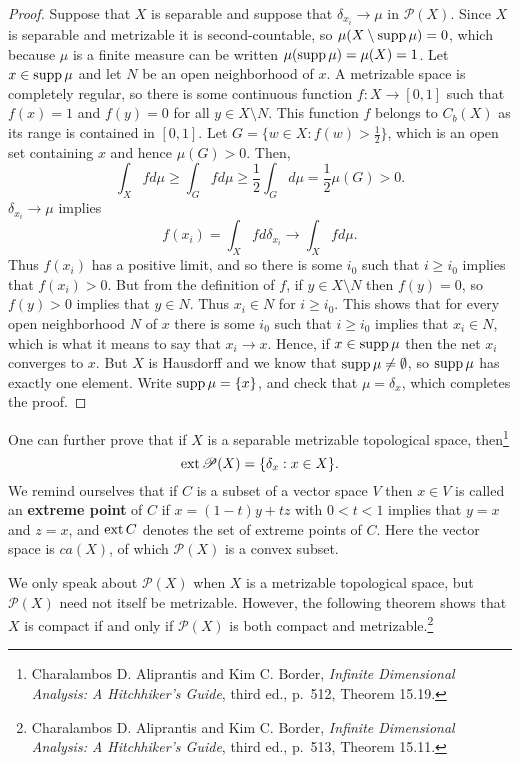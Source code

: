 \documentclass{article}
\newcommand{\supp}{\ensuremath\mathrm{supp}\,}
\newcommand{\ext}{\ensuremath\mathrm{ext}\,}
\theoremstyle{definition}
\theoremstyle{definition}
\begin{document}
\begin{proof}
Suppose that $X$ is separable and suppose that $\delta_{x_i} \to \mu$ in $\mathscr{P}(X)$. 
Since $X$ is separable and metrizable  it is second-countable, so $\mu(X \setminus \supp \mu)=0$, which because $\mu$ is a finite measure
can be written $\mu(\supp \mu)=\mu(X)=1$. Let $x \in \supp \mu$ and let $N$ be an open neighborhood of $x$. 
 A metrizable space is completely regular,  so there is some continuous function $f:X \to [0,1]$ such that
$f(x)=1$ and $f(y)=0$ for all $y \in X \setminus N$. This function $f$ belongs to $C_b(X)$ as its range is contained in $[0,1]$.
Let $G=\{w \in X: f(w)>\frac{1}{2}\}$, which is an open set containing $x$ and hence
$\mu(G)>0$. Then,
\[
\int_X f d\mu \geq \int_G f d\mu \geq \frac{1}{2} \int_G d\mu= \frac{1}{2}\mu(G)>0.
\]
 $\delta_{x_i} \to \mu$ implies
\[
f(x_i) = \int_X f d\delta_{x_i} \to \int_X f d\mu.
\]
Thus $f(x_i)$ has a positive limit, and so there is some $i_0$ such that $i \geq i_0$ implies that
$f(x_i)>0$. 
But from the definition of $f$, if $y \in X \setminus N$ then $f(y)=0$, so $f(y)>0$ implies that $y  \in N$. Thus $x_i \in N$ for $i \geq i_0$.
This shows that for every open neighborhood $N$ of $x$ there is some $i_0$ such that $i \geq i_0$
implies that $x_i \in N$, which is what it means to say that $x_i \to x$. Hence, if $x \in \supp \mu$ then the net $x_i$ converges  to $x$. But
$X$ is Hausdorff and we know that $\supp \mu \neq \emptyset$, so $\supp \mu$ has exactly one element. Write $\supp \mu = \{x\}$, and 
check that $\mu=\delta_x$, which completes the proof.
\end{proof}

One can further prove that if $X$ is a separable metrizable topological space, then\footnote{Charalambos D. 
Aliprantis and Kim C. Border, {\em Infinite Dimensional Analysis: A Hitchhiker's Guide}, third ed., p.~512, Theorem 15.19.}
\[
\ext \mathscr{P}(X) = \{\delta_x: x \in X\}.
\]
We remind ourselves that if $C$ is a subset of a vector space $V$ then $x \in V$ is called an \textbf{extreme point} of $C$
if $x=(1-t)y+tz$ with $0<t<1$ implies that $y=x$ and $z=x$, and 
$\ext C$ denotes the set of extreme points of $C$. Here the vector space is $ca(X)$, of
which $\mathscr{P}(X)$ is a convex subset.



We only speak about $\mathscr{P}(X)$ when $X$ is a  metrizable topological space, but
$\mathscr{P}(X)$  need not  itself be metrizable. However, the following theorem shows that
$X$ is compact if and only if $\mathscr{P}(X)$ is both compact and metrizable.\footnote{Charalambos D. 
Aliprantis and Kim C. Border, {\em Infinite Dimensional Analysis: A Hitchhiker's Guide}, third ed., p.~513, Theorem 15.11.}
\end{document}
